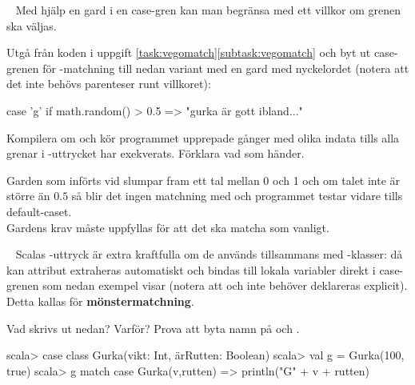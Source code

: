 \QUESTEND







\QUESTBEGIN

\Task  \what~  Med hjälp en gard  i en case-gren kan man begränsa med ett villkor om grenen ska väljas.

Utgå från koden i uppgift \ref{task:vegomatch}\ref{subtask:vegomatch} och byt ut case-grenen för -matchning till nedan variant med en gard med nyckelordet  (notera att det inte behövs parenteser runt villkoret):
\begin{Code}
    case 'g' if math.random() > 0.5 => "gurka är gott ibland..."
\end{Code}
Kompilera om och kör programmet upprepade gånger med olika indata tills alla grenar i -uttrycket har exekverats. Förklara vad som händer.

\SOLUTION


\TaskSolved \what

Garden som införts vid  slumpar fram ett tal mellan 0 och 1 och om talet inte är större än $0.5$ så blir det ingen matchning med  och programmet testar vidare tills default-caset.\\
Gardens krav måste uppfyllas för att det ska matcha som vanligt.



\QUESTEND







\QUESTBEGIN

\Task \label{task:match-caseclass} \what~   Scalas -uttryck är extra kraftfulla om de används tillsammans med -klasser: då kan attribut extraheras automatiskt och bindas till lokala variabler direkt i case-grenen som nedan exempel visar (notera att  och  inte behöver deklareras explicit). Detta kallas för \textbf{mönstermatchning}.

\Subtask \label{subtask:autobinding-match} Vad skrivs ut nedan? Varför? Prova att byta namn på  och .
\begin{REPL}
scala> case class Gurka(vikt: Int, ärRutten: Boolean)
scala> val g = Gurka(100, true)
scala> g match { case Gurka(v,rutten) => println("G" + v + rutten) }
\end{REPL}

